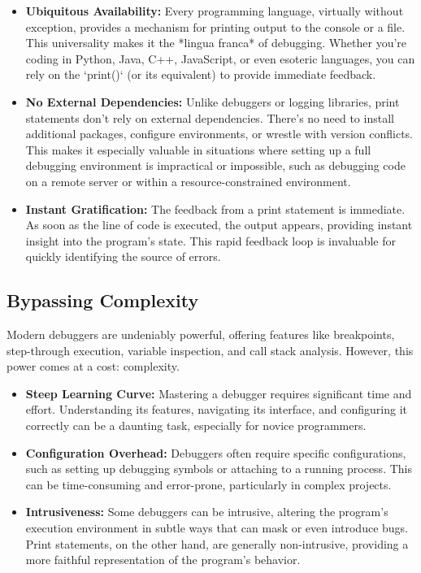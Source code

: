 \documentclass{article}
\begin{document}
\begin{itemize}
    \item \textbf{Ubiquitous Availability:} Every programming language, virtually without exception, provides a mechanism for printing output to the console or a file. This universality makes it the *lingua franca* of debugging.  Whether you're coding in Python, Java, C++, JavaScript, or even esoteric languages, you can rely on the `print()` (or its equivalent) to provide immediate feedback.

    \item \textbf{No External Dependencies:}  Unlike debuggers or logging libraries, print statements don't rely on external dependencies.  There's no need to install additional packages, configure environments, or wrestle with version conflicts.  This makes it especially valuable in situations where setting up a full debugging environment is impractical or impossible, such as debugging code on a remote server or within a resource-constrained environment.

    \item \textbf{Instant Gratification:}  The feedback from a print statement is immediate.  As soon as the line of code is executed, the output appears, providing instant insight into the program's state.  This rapid feedback loop is invaluable for quickly identifying the source of errors.
\end{itemize}

\subsection*{Bypassing Complexity}

Modern debuggers are undeniably powerful, offering features like breakpoints, step-through execution, variable inspection, and call stack analysis. However, this power comes at a cost: complexity.

\begin{itemize}
    \item \textbf{Steep Learning Curve:} Mastering a debugger requires significant time and effort. Understanding its features, navigating its interface, and configuring it correctly can be a daunting task, especially for novice programmers.

    \item \textbf{Configuration Overhead:}  Debuggers often require specific configurations, such as setting up debugging symbols or attaching to a running process. This can be time-consuming and error-prone, particularly in complex projects.

    \item \textbf{Intrusiveness:} Some debuggers can be intrusive, altering the program's execution environment in subtle ways that can mask or even introduce bugs.  Print statements, on the other hand, are generally non-intrusive, providing a more faithful representation of the program's behavior.
\end{itemize}
\end{document}
